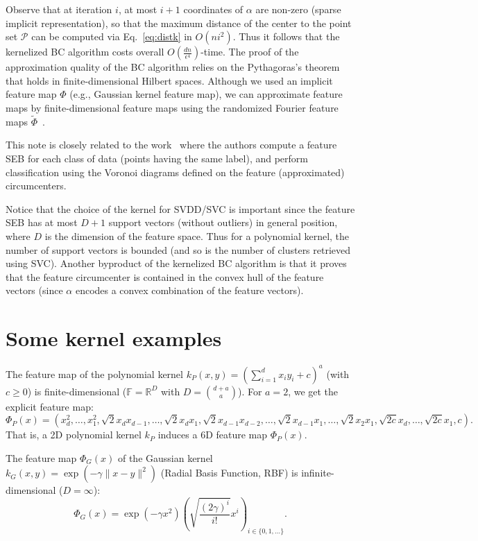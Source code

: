 \documentclass{article}
\def\calP{\mathcal{P}}
\def\bbR{\mathbb{R}}
\def\bbF{\mathbb{F}}
\begin{document}
Observe that at iteration $i$, at most $i+1$ coordinates of $\alpha$ are non-zero (sparse implicit representation), so that the maximum distance of the center to the point set $\calP$ can be computed via Eq.~\ref{eq:distk}
 in $O(ni^2)$.
Thus  it follows that the kernelized BC algorithm costs overall $O(\frac{dn}{\epsilon^4})$-time.
The proof of the approximation quality of the BC algorithm relies on the Pythagoras's theorem~\cite{PythaI-2002,PythaII-2002} that holds in finite-dimensional Hilbert spaces.
Although we used an implicit feature map $\Phi$ (e.g., Gaussian kernel feature map), we can approximate  feature maps
by  finite-dimensional feature maps using the randomized Fourier feature maps $\tilde{\Phi}$~\cite{RFF-2008}. 

 This note is closely related to the work~\cite{Bulatov-2004} where the authors compute a feature SEB for each class of data (points having the same label), and perform classification using the Voronoi diagrams defined on the feature (approximated) circumcenters. 


Notice that the choice of the kernel for SVDD/SVC is important since the feature SEB has at most $D+1$ support vectors (without outliers) in general position, where $D$ is the dimension of the feature space. Thus for a polynomial kernel, the number of support vectors is bounded (and so is the number of clusters retrieved using SVC).
Another byproduct of the kernelized BC algorithm is that it proves that the feature circumcenter is contained in the convex hull of the feature vectors (since $\alpha$ encodes a convex combination of the feature vectors).



 



\section{Some kernel examples}

The feature map of the polynomial kernel $k_P(x,y) = \left(\sum_{i=1}^d x_i y_i + c\right)^a$  (with $c\geq 0$) is finite-dimensional ($\bbF=\bbR^D$ with $D=\binom{d+a}{a}$).
For $a=2$, we get the explicit feature map:
$$
\Phi_P(x)=  \left(x_d^2, \ldots, x_1^2, \sqrt{2} x_d x_{d-1}, \ldots, \sqrt{2} x_d x_1, \sqrt{2} x_{d-1} x_{d-2}, \ldots, 
\sqrt{2} x_{d-1} x_{1}, \ldots, \sqrt{2} x_{2} x_{1}, \sqrt{2c} x_d, \ldots, \sqrt{2c} x_1, c \right). 
$$
That is, a 2D polynomial kernel $k_P$ induces a 6D feature map $\Phi_P(x)$.

The feature map $\Phi_G(x)$ of the Gaussian kernel $k_G(x,y)=\exp(-\gamma \|x-y\|^2)$ (Radial Basis Function, RBF) is infinite-dimensional ($D=\infty$):
$$
\Phi_G(x)=\exp(-\gamma x^2) \left(\sqrt{\frac{(2\gamma)^i}{i!}}x^i\right)_{i\in\{0,1,\ldots\}}.
$$






 







\end{document}
